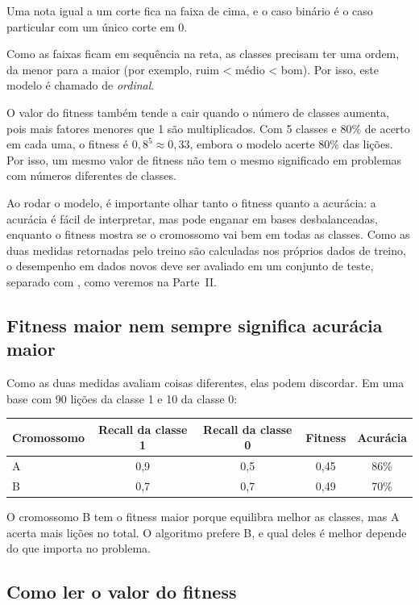 \documentclass[11pt,a4paper]{article}
\newcommand{\code}[1]{\texttt{\detokenize{#1}}}
\newenvironment{tabela}{\par\nopagebreak[4]\vspace{0.3em}\nopagebreak[4]\begingroup\centering\small}{\par\endgroup\vspace{0.6em}}
\begin{document}
Uma nota igual a um corte fica na faixa de cima, e o caso binário é o caso particular com um único corte em 0.

Como as faixas ficam em sequência na reta, as classes precisam ter uma ordem, da menor para a maior (por exemplo, ruim < médio < bom). Por isso, este modelo é chamado de \emph{ordinal}.

O valor do fitness também tende a cair quando o número de classes aumenta, pois mais fatores menores que 1 são multiplicados. Com 5 classes e 80\% de acerto em cada uma, o fitness é $0{,}8^5 \approx 0{,}33$, embora o modelo acerte 80\% das lições. Por isso, um mesmo valor de fitness não tem o mesmo significado em problemas com números diferentes de classes.

\begin{nota}
Ao rodar o modelo, é importante olhar tanto o fitness quanto a acurácia: a acurácia é fácil de interpretar, mas pode enganar em bases desbalanceadas, enquanto o fitness mostra se o cromossomo vai bem em todas as classes. Como as duas medidas retornadas pelo treino são calculadas nos próprios dados de treino, o desempenho em dados novos deve ser avaliado em um conjunto de teste, separado com \code{dividir_treino_teste}, como veremos na Parte~II.
\end{nota}

\subsection{Fitness maior nem sempre significa acurácia maior}

Como as duas medidas avaliam coisas diferentes, elas podem discordar. Em uma base com 90 lições da classe 1 e 10 da classe 0:

\begin{tabela}
\begin{tabular}{lcccc}
\toprule
Cromossomo & Recall da classe 1 & Recall da classe 0 & Fitness & Acurácia\\
\midrule
A & 0,9 & 0,5 & 0,45 & 86\%\\
B & 0,7 & 0,7 & 0,49 & 70\%\\
\bottomrule
\end{tabular}
\end{tabela}

O cromossomo B tem o fitness maior porque equilibra melhor as classes, mas A acerta mais lições no total. O algoritmo prefere B, e qual deles é melhor depende do que importa no problema.

\subsection{Como ler o valor do fitness}
\end{document}
